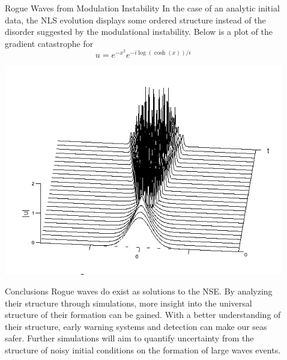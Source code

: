 \documentclass[final]{beamer}
\begin{document}
\begin{frame}{}
\begin{columns}[t]
\begin{column}{.35\linewidth}
\begin{block}{Rogue Waves from Modulation Instability}
	\vspace{5mm}
In the case of an analytic initial data, the NLS evolution displays some ordered structure instead of the disorder suggested by the modulational instability. Below is a plot of the gradient catastrophe for \[ u=e^{-x^2}e^{-i\log (\cosh (x)) /\epsilon } \]
		
		\vspace{-.25cm}
				\centering
\includegraphics[width=670px]{t1_65536pts_512plotted.png}


			\end{block}
		\hspace{0.25cm}
		\vspace{-1cm}
			\begin{block}{Conclusions}
	Rogue waves do exist as solutions to the NSE. By analyzing their structure through simulations, more insight into the universal structure of their formation can be gained. With a better understanding of their structure, early warning systems and detection can make our seas safer. Further simulations will aim to quantify uncertainty from the structure of noisy initial conditions on the formation of large waves events.\\[1ex]
		\end{block}
		
		
\end{column}  


\begin{column}{.005\linewidth}
\end{column}  
	\begin{column}{.255\linewidth}
   

\end{column}
\end{columns}
\end{frame}
\end{document}
